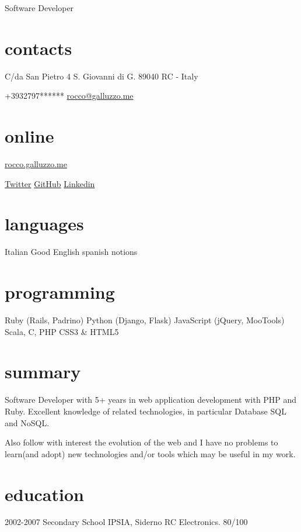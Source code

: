 \documentclass[print]{cv}
\begin{document}
       {Software Developer}

\begin{aside}%
\section{contacts}
    C/da San Pietro 4
    S. Giovanni di G.
89040 RC - Italy\par\smallskip%
+3932797******
	\href{mailto:rocco@galluzzo.me}{rocco@galluzzo.me}
	\section{online}
	\href{http://rocco.galluzzo.me}{rocco.galluzzo.me}
         \par\smallskip%
	\href{http://twitter.com/byterussian}{Twitter}
           \href{https://github.com/byterussian}{GitHub}
           \href{http://www.linkedin.com/in/roccogalluzzo}{Linkedin}
  \section{languages}
    Italian
    Good English
    spanish notions
  \section{programming}
    Ruby
    (Rails, Padrino)
    Python
    (Django, Flask)
    JavaScript
    (jQuery, MooTools)
    Scala, C, PHP
    CSS3 \& HTML5
\end{aside}

\section{summary}
Software Developer with 5+ years in web application development with
PHP and Ruby. Excellent knowledge of related technologies, in particular
Database SQL and NoSQL.

Also follow with interest the evolution of the web and I have no problems to learn(and adopt)
new technologies and/or tools which may be useful in my work.
\section{education}

\begin{entrylist}

  \entry
    {2002-2007}
    {Secondary School}
    {IPSIA, Siderno RC}
    {Electronics. 80/100}

\end{entrylist}
\end{document}
